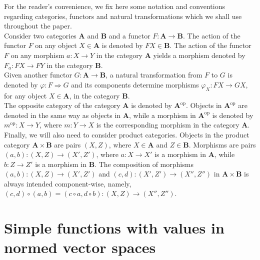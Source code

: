 \documentclass{amsart}
\theoremstyle{definition}
\theoremstyle{plain}
\begin{document}
        For the reader's convenience, we fix here some notation and conventions regarding categories, functors and natural transformations which we shall use throughout the paper. \\
        Consider two categories $\mathbf{A}$ and $\mathbf{B}$ and a functor $F \colon \mathbf{A} \rightarrow \mathbf{B}$.
        The action of the functor $F$ on any object $X \in \mathbf{A}$ is denoted by $FX \in \mathbf{B}$.
        The action of the functor $F$ on any morphism $a \colon X \rightarrow Y$ in the category $\mathbf{A}$ yields a morphism denoted by $F_a \colon FX \rightarrow FY$ in the category $\mathbf{B}$. \\
        Given another functor $G \colon \mathbf{A} \rightarrow \mathbf{B}$, a natural transformation from $F$ to $G$ is denoted by $\varphi \colon F \Rightarrow G$ and its components determine morphisms $\varphi_X \colon FX \rightarrow GX$, for any object $X \in \mathbf{A}$, in the category $\mathbf{B}$. \\
        The opposite category of the category $\mathbf{A}$ is denoted by $\mathbf{A}^{\mathrm{op}}$.
        Objects in $\mathbf{A}^{\mathrm{op}}$ are denoted in the same way as objects in $\mathbf{A}$, while a morphism in $\mathbf{A}^{\mathrm{op}}$ is denoted by $m^{\mathrm{op}} \colon X \rightarrow Y$, where $m \colon Y \rightarrow X$ is the corresponding morphism in the category $\mathbf{A}$. \\
        Finally, we will also need to consider product categories.
        Objects in the product category $\mathbf{A} \times \mathbf{B}$ are pairs $(X,Z)$, where $X \in \mathbf{A}$ and $Z \in \mathbf{B}$.
        Morphisms are pairs $(a,b) \colon (X,Z) \rightarrow (X',Z')$, where $a \colon X \rightarrow X'$ is a morphism in $\mathbf{A}$, while $b \colon Z \rightarrow Z'$ is a morphism in $\mathbf{B}$.
        The composition of morphisms $(a,b) \colon (X,Z) \rightarrow (X',Z')$ and $(c,d) \colon (X',Z') \rightarrow (X'',Z'')$ in $\mathbf{A} \times \mathbf{B}$ is always intended component-wise, namely, $(c,d) \circ (a,b) = (c \circ a,d \circ b) \colon (X,Z) \rightarrow (X'',Z'')$.


\section{Simple functions with values in normed vector spaces}
\label{sec:simple functions with values in normed vector spaces}
\end{document}
